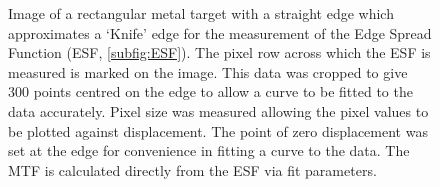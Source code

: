 	\begin{figure}[H]
		\centering
		\caption{Image of a rectangular metal target with a straight edge which  approximates a `Knife' edge for the measurement of the Edge Spread Function (ESF, \ref{subfig:ESF}). The pixel row across which the ESF is measured is marked on the image. This data was cropped to give 300 points centred on the edge to allow a curve to be fitted to the data  accurately.  Pixel size was measured  allowing the pixel values to be plotted against displacement. The point of zero displacement was set at the edge for convenience in fitting a curve to the data.  The MTF is calculated directly from the ESF via  fit parameters. }
		\label{fig:MTFtarget}
	\end{figure}

